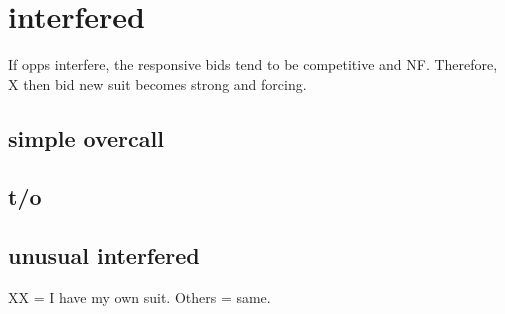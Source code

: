 \section{interfered}

If opps interfere, the responsive bids tend to be competitive and NF.
Therefore, X then bid new suit becomes strong and forcing.

\subsection{simple overcall}


\subsection{t/o}


\subsection{unusual interfered}

XX = I have my own suit. Others = same.